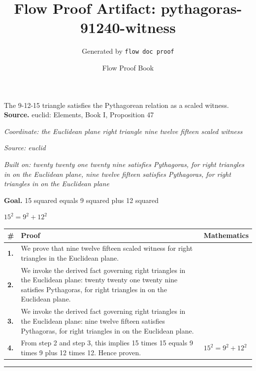 \documentclass[11pt]{article}
\title{Flow Proof Artifact: pythagoras-91240-witness}
\author{Generated by \texttt{flow doc proof}}
\date{Flow Proof Book}
\theoremstyle{definition}
\begin{document}
\maketitle
The 9-12-15 triangle satisfies the Pythagorean relation as a scaled witness.\\[0.5em]
\textbf{Source.} euclid: Elements, Book I, Proposition 47\\[0.5em]
\bigskip
{}\par
\smallskip\noindent\textit{Coordinate: the Euclidean plane \cdot right triangle \cdot nine twelve fifteen scaled witness}\par
\smallskip\noindent\textit{Source: euclid}\par
\smallskip\noindent\textit{Built on: twenty twenty one twenty nine satisfies Pythagoras, for right triangles in on the Euclidean plane, nine twelve fifteen satisfies Pythagoras, for right triangles in on the Euclidean plane}\par
\medskip
\noindent\textbf{Goal.} 15 squared equals 9 squared plus 12 squared\par
\noindent$\displaystyle 15^{2} = 9^{2} + 12^{2}$\par
\medskip
\noindent
\begin{tabular}{@{} >{\raggedright\arraybackslash}p{} >{\raggedright\arraybackslash}p{} >{\raggedleft\arraybackslash}p{} @{}}
\textbf{\#} & \textbf{Proof} & \textbf{Mathematics} \\
\midrule
\textbf{1.} & We prove that nine twelve fifteen scaled witness for right triangles in the Euclidean plane. & \\[0.45em]
\textbf{2.} & We invoke the derived fact governing right triangles in the Euclidean plane: twenty twenty one twenty nine satisfies Pythagoras, for right triangles in on the Euclidean plane. & \\[0.45em]
\textbf{3.} & We invoke the derived fact governing right triangles in the Euclidean plane: nine twelve fifteen satisfies Pythagoras, for right triangles in on the Euclidean plane. & \\[0.45em]
\textbf{4.} & From step 2 and step 3, this implies 15 times 15 equals 9 times 9 plus 12 times 12. Hence proven. & $\displaystyle 15^{2} = 9^{2} + 12^{2}$ \\[0.45em]
\bottomrule
\end{tabular}
\label{thm:Geometry-right triangle-nine_twelve_fifteen_scaled_witness}
\par\medskip\hrule
\end{document}
